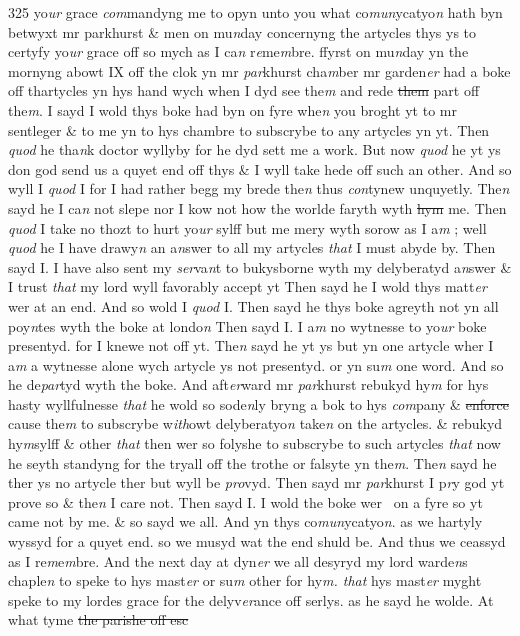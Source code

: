 \documentclass[12pt, a4paper]{book}
\begin{document}
{\color{Mahogany}325} yo\textit{ur} grace \textit{com}mandyng me to opyn unto you what co\textit{mun}ycatyo\textit{n} hath byn betwyxt mr parkhurst  \& men on mu\textit{n}day concernyng the artycles thys ys to certyfy yo\textit{ur }grace off so mych as I ca\textit{n} r\textit{e}me\textit{m}bre.  ffyrst on mu\textit{n}day yn the mornyng abowt IX off the clok yn mr \textit{par}khurst cha\textit{m}ber mr garden\textit{er} had a boke off thartycles yn hys hand wych when I dyd see the\textit{m} and rede \sout{them }part off the\textit{m}. I sayd I wold thys boke had byn on fyre whe\textit{n} you broght yt to mr sentleger \& to me yn to hys chambre to subscrybe to any artycles yn yt. Then  \textit{quod} he tha\textit{n}k doctor wyllyby for he dyd sett me a work. But now \textit{quod} he yt ys don  god send us a quyet end off thys \& I wyll take hede off such an other. And so wyll I \textit{quod} I for I had rather begg my brede the\textit{n} thus \textit{con}tynew unquyetly. The\textit{n} sayd he I ca\textit{n} not  slepe nor I kow not how the worlde faryth wyth \sout{hym }me. Then \textit{quod} I take no thozt to hurt yo\textit{ur} sylff but me mery wyth sorow as I a\textit{m} ; well \textit{quod} he I have drawy\textit{n} an a\textit{n}swer to all my artycles \textit{that} I must abyde by. Then sayd I. I have also sent my \textit{ser}va\textit{n}t to  bukysborne wyth my delyberatyd a\textit{n}swer \& I trust \textit{that} my lord wyll favorably accept yt Then sayd he I wold thys matt\textit{er} wer at an end. And so wold I \textit{quod} I. Then sayd he  thys boke agreyth not yn all poy\textit{n}tes wyth the boke at londo\textit{n} Then sayd I. I a\textit{m} no wytnesse to yo\textit{ur} boke presentyd. for I knewe not off yt. The\textit{n} sayd he yt ys but yn one artycle wher  I a\textit{m} a wytnesse alone wych artycle ys not presentyd. or yn su\textit{m} one word. And so he  de\textit{par}tyd wyth the boke. And aft\textit{er}ward mr \textit{par}khurst rebukyd hy\textit{m} for hys hasty wyllfulnesse \textit{that} he wold so sode\textit{n}ly bryng a bok to hys \textit{com}pany \& \sout{enforce }cause the\textit{m} to subscrybe w\textit{ith}owt delyberatyo\textit{n} take\textit{n} on the artycles. \& rebukyd hy\textit{m}sylff \& other \textit{that} then wer so folyshe  to subscrybe to such artycles \textit{that} now he seyth standyng for the tryall off the trothe or falsyte yn the\textit{m}. The\textit{n} sayd he ther ys no artycle ther but wyll be \textit{pro}vyd. Then sayd mr \textit{par}khurst I p\textit{r}y god yt prove so \& the\textit{n} I care not. Then sayd I. I wold the boke wer  on a fyre so yt came not by me. \& so sayd we all. And yn thys co\textit{mun}ycatyo\textit{n}. as we hartyly wyssyd for a quyet end. so we musyd wat the end shuld be. And thus we ceassyd as I re\textit{m}e\textit{m}bre. And the next day at dyn\textit{er} we all desyryd my lord warde\textit{n}s chaple\textit{n} to speke to hys mast\textit{er} or su\textit{m} other for hy\textit{m. that }hys mast\textit{er} myght speke to my lordes grace for the delyv\textit{er}ance off serlys. as he sayd he wolde. At what tyme \sout{the parishe off esc}
\end{document}
